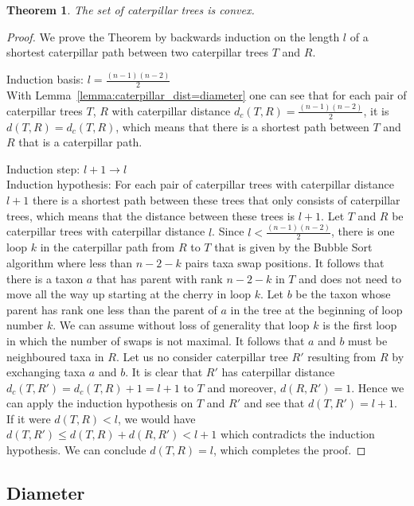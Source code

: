 \documentclass[11pt, a4paper]{article}
\newtheorem{theorem}[definition]{Theorem}
\begin{document}
\begin{theorem}
    The set of caterpillar trees is convex.
    \label{thm:caterpillar_convex}
\end{theorem}

\begin{proof}
    We prove the Theorem by backwards induction on the length $l$ of a shortest caterpillar path between two caterpillar trees $T$ and $R$.

    Induction basis: $l = \frac{(n-1)(n-2)}{2}$\\
    With Lemma~\ref{lemma:caterpillar_dist=diameter} one can see that for each pair of caterpillar trees $T$, $R$ with caterpillar distance $d_c(T,R) = \frac{(n-1)(n-2)}{2}$, it is $d(T,R) = d_c(T,R)$, which means that there is a shortest path between $T$ and $R$ that is a caterpillar path.

    Induction step: $l+1 \to l$\\
    Induction hypothesis: For each pair of caterpillar trees with caterpillar distance $l+1$ there is a shortest path between these trees that only consists of caterpillar trees, which means that the distance between these trees is $l+1$.
    Let $T$ and $R$ be caterpillar trees with caterpillar distance $l$.
    Since $l < \frac{(n-1)(n-2)}{2}$, there is one loop $k$ in the caterpillar path from $R$ to $T$ that is given by the Bubble Sort algorithm  where less than $n-2-k$ pairs taxa swap positions.
    It follows that there is a taxon $a$ that has parent with rank $n-2-k$ in $T$ and does not need to move all the way up starting at the cherry in loop $k$.
    Let $b$ be the taxon whose parent has rank one less than the parent of $a$ in the tree at the beginning of loop number $k$.
    We can assume without loss of generality that loop $k$ is the first loop in which the number of swaps is not maximal.
    It follows that $a$ and $b$ must be neighboured taxa in $R$.
    Let us no consider caterpillar tree $R'$ resulting from $R$ by exchanging taxa $a$ and $b$.
    It is clear that $R'$ has caterpillar distance $d_c(T,R') = d_c(T,R) + 1 = l+1$ to $T$ and moreover, $d(R,R') = 1$.
    Hence we can apply the induction hypothesis on $T$ and $R'$ and see that $d(T,R') = l+1$.
    If it were $d(T,R) < l$, we would have $d(T,R') \leq d(T,R) + d(R,R') < l + 1$ which contradicts the induction hypothesis.
    We can conclude $d(T,R) = l$, which completes the proof.
\end{proof}


\subsection{Diameter}
\end{document}

